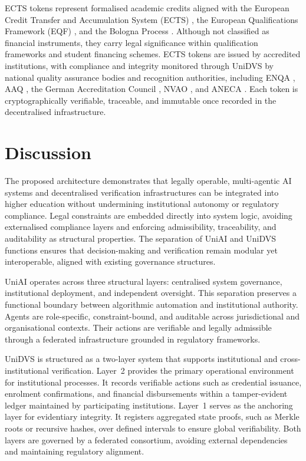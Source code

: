 \documentclass[oneside,10pt]{swissi}
\begin{document}
ECTS tokens represent formalised academic credits aligned with the European Credit Transfer and Accumulation System (ECTS) \cite{ec2015ects}, the European Qualifications Framework (EQF) \cite{ec2017eqf}, and the Bologna Process \cite{ehea2020bologna}. Although not classified as financial instruments, they carry legal significance within qualification frameworks and student financing schemes. ECTS tokens are issued by accredited institutions, with compliance and integrity monitored through UniDVS by national quality assurance bodies and recognition authorities, including ENQA \cite{enqa2015esg}, AAQ \cite{aaq2024}, the German Accreditation Council \cite{germanaccreditation2022}, NVAO \cite{nvao2023}, and ANECA \cite{aneca2023}. Each token is cryptographically verifiable, traceable, and immutable once recorded in the decentralised infrastructure.

\section{Discussion}

The proposed architecture demonstrates that legally operable, multi-agentic AI systems and decentralised verification infrastructures can be integrated into higher education without undermining institutional autonomy or regulatory compliance. Legal constraints are embedded directly into system logic, avoiding externalised compliance layers and enforcing admissibility, traceability, and auditability as structural properties. The separation of UniAI and UniDVS functions ensures that decision-making and verification remain modular yet interoperable, aligned with existing governance structures.

UniAI operates across three structural layers: centralised system governance, institutional deployment, and independent oversight. This separation preserves a functional boundary between algorithmic automation and institutional authority. Agents are role-specific, constraint-bound, and auditable across jurisdictional and organisational contexts. Their actions are verifiable and legally admissible through a federated infrastructure grounded in regulatory frameworks.

UniDVS is structured as a two-layer system that supports institutional and cross-institutional verification. Layer~2 provides the primary operational environment for institutional processes. It records verifiable actions such as credential issuance, enrolment confirmations, and financial disbursements within a tamper-evident ledger maintained by participating institutions. Layer~1 serves as the anchoring layer for evidentiary integrity. It registers aggregated state proofs, such as Merkle roots or recursive hashes, over defined intervals to ensure global verifiability. Both layers are governed by a federated consortium, avoiding external dependencies and maintaining regulatory alignment.
\end{document}
